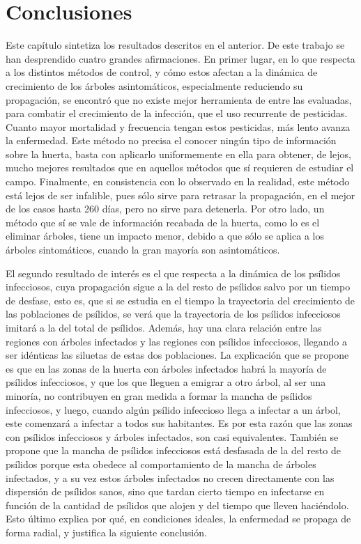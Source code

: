 \chapter{Conclusiones}

Este capítulo sintetiza los resultados descritos en el anterior. De este trabajo se han desprendido cuatro grandes afirmaciones. En primer lugar, en lo que respecta a los distintos métodos de control, y cómo estos afectan a la dinámica de crecimiento de los árboles asintomáticos, especialmente reduciendo su propagación, se encontró que no existe mejor herramienta de entre las evaluadas, para combatir el crecimiento de la infección, que el uso recurrente de pesticidas. Cuanto mayor mortalidad y frecuencia tengan estos pesticidas, más lento avanza la enfermedad. Este método no precisa el conocer ningún tipo de información sobre la huerta, basta con aplicarlo uniformemente en ella para obtener, de lejos, mucho mejores resultados que en aquellos métodos que sí requieren de estudiar el campo. Finalmente, en consistencia con lo observado en la realidad, este método está lejos de ser infalible, pues sólo sirve para retrasar la propagación, en el mejor de los casos hasta 260 días, pero no sirve para detenerla. Por otro lado, un método que sí se vale de información recabada de la huerta, como lo es el eliminar árboles, tiene un impacto menor, debido a que sólo se aplica a los árboles sintomáticos, cuando la gran mayoría son asintomáticos.

El segundo resultado de interés es el que respecta a la dinámica de los psílidos infecciosos, cuya propagación sigue a la del resto de psílidos salvo por un tiempo de desfase, esto es, que si se estudia en el tiempo la trayectoria del crecimiento de las poblaciones de psílidos, se verá que la trayectoria de los psílidos infecciosos imitará a la del total de psílidos. Además, hay una clara relación entre las regiones con árboles infectados y las regiones con psílidos infecciosos, llegando a ser idénticas las siluetas de estas dos poblaciones. La explicación que se propone es que en las zonas de la huerta con árboles infectados habrá la mayoría de psílidos infecciosos, y que los que lleguen a emigrar a otro árbol, al ser una minoría, no contribuyen en gran medida a formar la mancha de psílidos infecciosos, y luego, cuando algún psílido infeccioso llega a infectar a un árbol, este comenzará a infectar a todos sus habitantes. Es por esta razón que las zonas con psílidos infecciosos y árboles infectados, son casi equivalentes. También se propone que la mancha de psílidos infecciosos está desfasada de la del resto de psílidos porque esta obedece al comportamiento de la mancha de árboles infectados, y a su vez estos árboles infectados no crecen directamente con las dispersión de psílidos sanos, sino que tardan cierto tiempo en infectarse en función de la cantidad de psílidos que alojen y del tiempo que lleven haciéndolo. Esto último explica por qué, en condiciones ideales, la enfermedad se propaga de forma radial, y justifica la siguiente conclusión.
 
